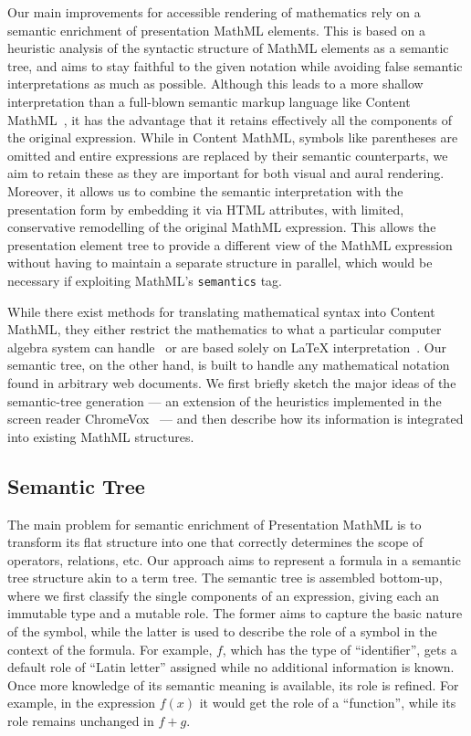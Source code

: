 \documentclass[conference]{IEEEtran}
\begin{document}
Our main improvements for accessible rendering of mathematics rely on a semantic
enrichment of presentation MathML elements. This is based on a heuristic
analysis of the syntactic structure of MathML elements as a semantic tree, and
aims to stay faithful to the given notation while avoiding false semantic
interpretations as much as possible. Although this leads to a more shallow
interpretation than a full-blown semantic markup language like Content
MathML~\cite{MathML3}, it has the advantage that it retains effectively all the
components of the original expression. While in Content MathML, symbols like
parentheses are omitted and entire expressions are replaced by their semantic
counterparts, we aim to retain these as they are important for both visual and
aural rendering.  Moreover, it allows us to combine the semantic interpretation
with the presentation form by embedding it via HTML attributes, with limited,
conservative remodelling of the original MathML expression. This allows the
presentation element tree to provide a different view of the MathML expression
without having to maintain a separate structure in parallel, which would be
necessary if exploiting MathML's \texttt{semantics} tag.

While there exist methods for translating mathematical syntax into Content
MathML, they either restrict the mathematics to what a particular computer
algebra system can handle~\cite{Maple,Mathematica} or are based solely on
{\LaTeX} interpretation~\cite{miller2010latexml, mooresemantic, SnuggleTeX}.
Our semantic tree, on the other hand, is built to handle any mathematical
notation found in arbitrary web documents.  We first briefly sketch the major
ideas of the semantic-tree generation --- an extension of the heuristics
implemented in the screen reader ChromeVox~\cite{Sorge14} --- and then describe
how its information is integrated into existing MathML structures.

\subsection{Semantic Tree}
\label{sec:semantic-tree}

The main problem for semantic enrichment of Presentation MathML is to transform
its flat structure into one that correctly determines the scope of operators,
relations, etc.  Our approach aims to represent a formula in a semantic tree
structure akin to a term tree. The semantic tree is assembled bottom-up, where
we first classify the single components of an expression, giving each an
immutable type and a mutable role. The former aims to capture the basic nature
of the symbol, while the latter is used to describe the role of a symbol in the
context of the formula. For example, $f$, which has the type of ``identifier'', gets
a default role of ``Latin letter'' assigned while no additional information is
known. Once more knowledge of its semantic meaning is available, its role is
refined. For example, in the expression $f(x)$ it would get the role of a
``function'', while its role remains unchanged in $f + g$.
\end{document}
